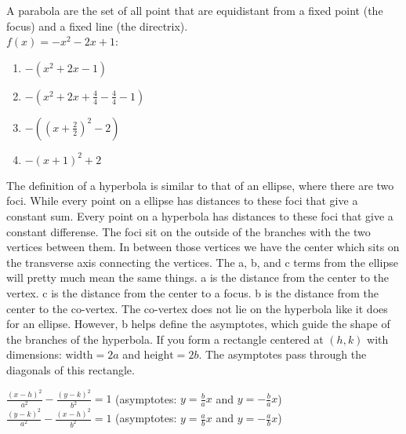 \documentclass{article}
\begin{document}
A parabola are the set of all point that are equidistant from a fixed point (the focus) and a fixed line (the directrix).\\

$f(x) = -x^2 - 2x + 1$:
	\begin{enumerate}
		\item $-(x^2 + 2x - 1)$
		\item $-(x^2 + 2x + \frac{4}{4} - \frac{4}{4} - 1)$ 
		\item $-((x + \frac{2}{2})^2 - 2)$ 
		\item $-(x + 1)^2 + 2$
	\end{enumerate}

The definition of a hyperbola is similar to that of an ellipse, where there are two foci. While every point on a ellipse has distances to these foci that give a constant sum. Every point on a hyperbola has distances to these foci that give a constant differense. The foci sit on the outside of the branches with the two vertices between them. In between those vertices we have the center which sits on the transverse axis connecting the vertices. The a, b, and c terms from the ellipse will pretty much mean the same things. a is the distance from the center to the vertex. c is the distance from the center to a focus. b is the distance from the center to the co-vertex. The co-vertex does not lie on the hyperbola like it does for an ellipse. However, b helps define the asymptotes, which guide the shape of the branches of the hyperbola. If you form a rectangle centered at $(h, k)$ with dimensions: $\text{width} = 2a$ and $\text{height} = 2b$. The asymptotes pass through the diagonals of this rectangle.

$\frac{(x - h)^2}{a^2} - \frac{(y - k)^2}{b^2} = 1$ (asymptotes: $y = \frac{b}{a}x$ and $y = -\frac{b}{a}x$)\\ 
  
$\frac{(y - k)^2}{a^2} - \frac{(x - h)^2}{b^2} = 1$ (asymptotes: $y = \frac{a}{b}x$ and $y = -\frac{a}{b}x$)\\ 
\end{document}
